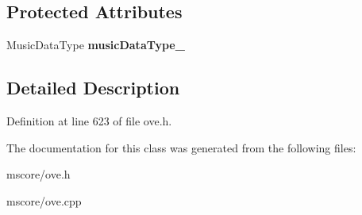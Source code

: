 \subsection*{Protected Attributes}
\begin{DoxyCompactItemize}
\item 
\mbox{\label{class_o_v_e_1_1_music_data_ab5205156efc6c6631b9ae56ea12d7f47}} 
Music\+Data\+Type {\bfseries music\+Data\+Type\+\_\+}
\end{DoxyCompactItemize}


\subsection{Detailed Description}


Definition at line 623 of file ove.\+h.



The documentation for this class was generated from the following files\+:\begin{DoxyCompactItemize}
\item 
mscore/ove.\+h\item 
mscore/ove.\+cpp\end{DoxyCompactItemize}
